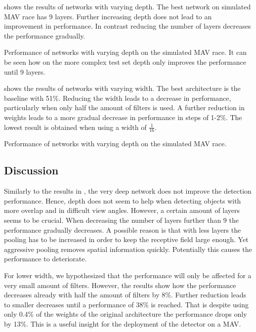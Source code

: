  shows the results of networks with varying depth. The best network on simulated \ac{MAV} race has 9 layers. Further increasing depth does not lead to an improvement in performance. In contrast reducing the number of layers decreases the performance gradually. 

\begin{table}[hbtp]
	\centering
	
	\caption{Performance of networks with varying depth on the simulated \ac{MAV} race. It can be seen how on the more complex test set depth only improves the performance until 9 layers.}
	\label{tab:depth}
\end{table}

 shows the results of networks with varying width. The best architecture is the baseline with 51\%. Reducing the width leads to a decrease in performance, particularly when only half the amount of filters is used. A further reduction in weights leads to a more gradual decrease in performance in steps of 1-2\%. The lowest result is obtained when using a width of $\frac{1}{16}$.

\begin{table}[hbtp]
	\centering
	
	\caption{Performance of networks with varying depth on the simulated \ac{MAV} race. }
	\label{tab:width}
\end{table}

\subsection{Discussion}

Similarly to the results in , the very deep network does not improve the detection performance. Hence, depth does not seem to help when detecting objects with more overlap and in difficult view angles. However, a certain amount of layers seems to be crucial. When decreasing the number of layers further than 9 the performance gradually decreases. A possible reason is that with less layers the pooling has to be increased in order to keep the receptive field large enough. Yet aggressive pooling removes spatial information quickly. Potentially this causes the performance to deteriorate.

For lower width, we hypothesized that the performance will only be affected for a very small amount of filters. However, the results show how the performance decreases already with half the amount of filters by 8\%. Further reduction leads to smaller decreases until a performance of 38\% is reached. That is despite using only 0.4\% of the weights of the original architecture the performance drops only by 13\%. This is a useful insight for the deployment of the detector on a \ac{MAV}.

